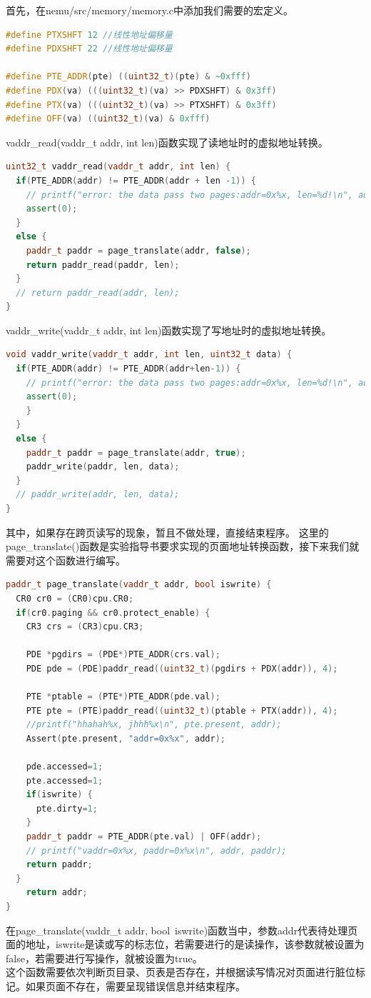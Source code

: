 \documentclass[UTF8,a4paper,10pt]{ctexart}
\begin{document}
首先，在nemu/src/memory/memory.c中添加我们需要的宏定义。
\begin{lstlisting}[language = C++]
#define PTXSHFT 12 //线性地址偏移量
#define PDXSHFT 22 //线性地址偏移量 

#define PTE_ADDR(pte) ((uint32_t)(pte) & ~0xfff)
#define PDX(va) (((uint32_t)(va) >> PDXSHFT) & 0x3ff)
#define PTX(va) (((uint32_t)(va) >> PTXSHFT) & 0x3ff)
#define OFF(va) ((uint32_t)(va) & 0xfff)
\end{lstlisting}
vaddr\_read(vaddr\_t addr, int len)函数实现了读地址时的虚拟地址转换。
\begin{lstlisting}[language = C++]
uint32_t vaddr_read(vaddr_t addr, int len) {
  if(PTE_ADDR(addr) != PTE_ADDR(addr + len -1)) {
    // printf("error: the data pass two pages:addr=0x%x, len=%d!\n", addr, len);
    assert(0);
  }
  else {
    paddr_t paddr = page_translate(addr, false);
    return paddr_read(paddr, len);
  }
  // return paddr_read(addr, len);
}
\end{lstlisting}
vaddr\_write(vaddr\_t addr, int len)函数实现了写地址时的虚拟地址转换。
\begin{lstlisting}[language = C++]
  void vaddr_write(vaddr_t addr, int len, uint32_t data) {
  if(PTE_ADDR(addr) != PTE_ADDR(addr+len-1)) {
    // printf("error: the data pass two pages:addr=0x%x, len=%d!\n", addr, len);
    assert(0);
    }
  }
  else {
    paddr_t paddr = page_translate(addr, true);
    paddr_write(paddr, len, data);
  }
  // paddr_write(addr, len, data);
}
\end{lstlisting}
其中，如果存在跨页读写的现象，暂且不做处理，直接结束程序。
这里的page\_translate()函数是实验指导书要求实现的页面地址转换函数，接下来我们就需要对这个函数进行编写。
\begin{lstlisting}[language = C++]
paddr_t page_translate(vaddr_t addr, bool iswrite) {
  CR0 cr0 = (CR0)cpu.CR0;
  if(cr0.paging && cr0.protect_enable) {
    CR3 crs = (CR3)cpu.CR3;

    PDE *pgdirs = (PDE*)PTE_ADDR(crs.val);
    PDE pde = (PDE)paddr_read((uint32_t)(pgdirs + PDX(addr)), 4);

    PTE *ptable = (PTE*)PTE_ADDR(pde.val);
    PTE pte = (PTE)paddr_read((uint32_t)(ptable + PTX(addr)), 4);
    //printf("hhahah%x, jhhh%x\n", pte.present, addr);
    Assert(pte.present, "addr=0x%x", addr);

    pde.accessed=1;
    pte.accessed=1;
    if(iswrite) {
      pte.dirty=1;
    }
    paddr_t paddr = PTE_ADDR(pte.val) | OFF(addr);
    // printf("vaddr=0x%x, paddr=0x%x\n", addr, paddr);
    return paddr;
  }
	return addr;
}
\end{lstlisting}
在page\_translate(vaddr\_t addr, bool\ iswrite)函数当中，参数addr代表待处理页面的地址，iswrite是读或写的标志位，若需要进行的是读操作，该参数就被设置为false，若需要进行写操作，就被设置为true。\\
这个函数需要依次判断页目录、页表是否存在，并根据读写情况对页面进行脏位标记。如果页面不存在，需要呈现错误信息并结束程序。
\end{document}
